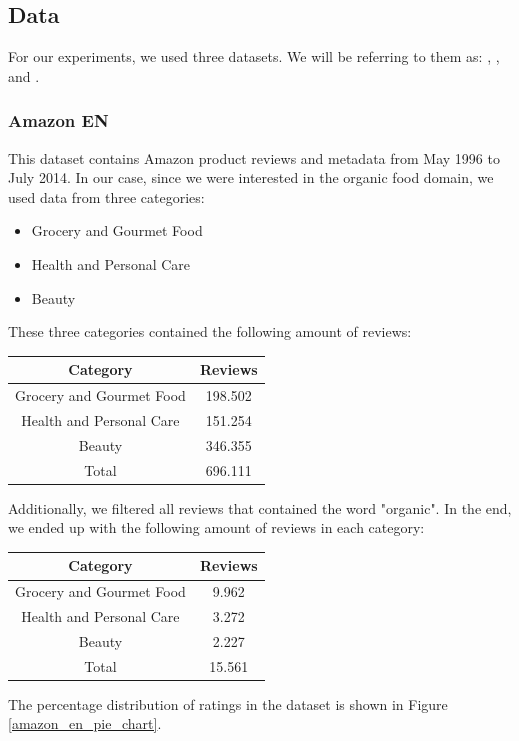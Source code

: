 \subsection{Data}
\label{data_section}
For our experiments, we used three datasets. We will be referring to them as: \dataEN, \dataORG, and \dataDE.
\subsubsection{Amazon EN}
This dataset contains Amazon product reviews and metadata from May 1996 to July 2014. In our case, since we were interested in the organic food domain, we used data from three categories:
\begin{itemize}
  \item Grocery and Gourmet Food
  \item Health and Personal Care
  \item Beauty
\end{itemize}
These three categories contained the following amount of reviews:
\begin{center}
 \begin{tabular}{||c c||} 
 \hline
 Category & Reviews\\ [0.4ex] 
 \hline\hline
 Grocery and Gourmet Food & 198.502\\ 
 \hline
 Health and Personal Care & 151.254\\
 \hline
 Beauty & 346.355\\
 \hline\hline
 Total & 696.111\\
 \hline
\end{tabular}
\end{center}
Additionally, we filtered all reviews that contained the word "organic". In the end, we ended up with the following amount of reviews in each category:
\begin{center}
 \begin{tabular}{||c c||} 
 \hline
 Category & Reviews\\ [0.4ex] 
 \hline\hline
 Grocery and Gourmet Food & 9.962\\ 
 \hline
 Health and Personal Care & 3.272\\
 \hline
 Beauty & 2.227\\
 \hline\hline
 Total & 15.561 \\
 \hline
\end{tabular}
\end{center}
The percentage distribution of ratings in the dataset is shown in Figure \ref{amazon_en_pie_chart}.\\

